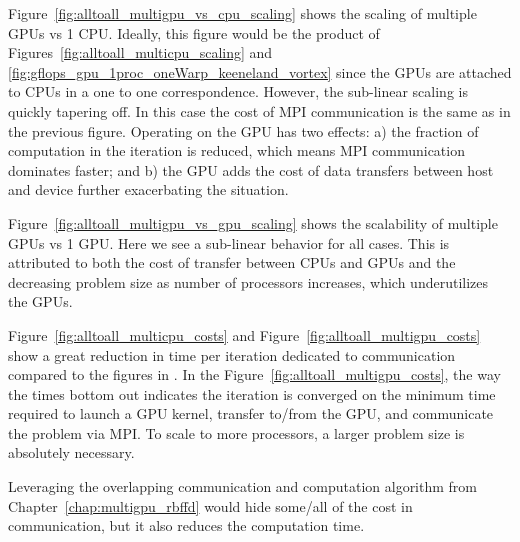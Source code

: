 Figure~\ref{fig:alltoall_multigpu_vs_cpu_scaling}  shows the scaling of multiple GPUs vs 1 CPU. Ideally, this figure would be the product of Figures~\ref{fig:alltoall_multicpu_scaling} and \ref{fig:gflops_gpu_1proc_oneWarp_keeneland_vortex} since the GPUs are attached to CPUs in a one to one correspondence. However, the sub-linear scaling is quickly tapering off. In this case the cost of MPI communication is the same as in the previous figure. Operating on the GPU has two effects: a) the fraction of computation in the iteration is reduced, which means MPI communication dominates faster; and b) the GPU adds the cost of data transfers between host and device further exacerbating the situation. 

Figure~\ref{fig:alltoall_multigpu_vs_gpu_scaling} shows the scalability of multiple GPUs vs 1 GPU. Here we see a sub-linear behavior for all cases. This is attributed to both the cost of transfer between CPUs and GPUs and the decreasing problem size as number of processors increases, which underutilizes the GPUs. 


Figure~\ref{fig:alltoall_multicpu_costs} and Figure~\ref{fig:alltoall_multigpu_costs} show a great reduction in time per iteration dedicated to communication compared to the figures in \cite{BolligFlyerErlebacher2012}. In the Figure~\ref{fig:alltoall_multigpu_costs}, the way the times bottom out indicates the iteration is converged on the minimum time required to launch a GPU kernel, transfer to/from the GPU, and communicate the problem via MPI. To scale to more processors, a larger problem size is absolutely necessary. 

Leveraging the overlapping communication and computation algorithm from Chapter~\ref{chap:multigpu_rbffd} would hide some/all of the cost in communication, but it also reduces the computation time. 



%    

%
%

